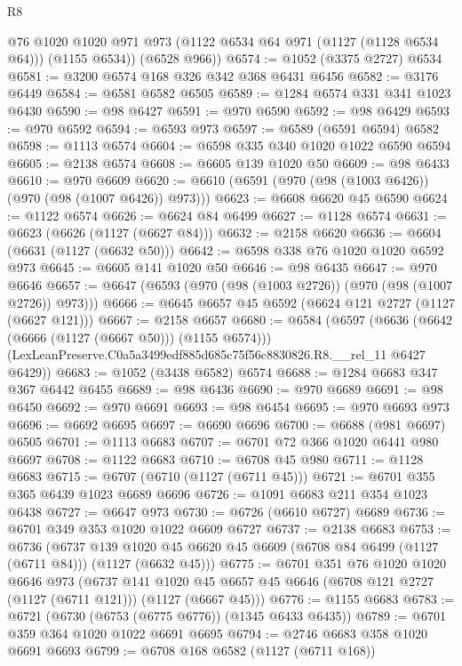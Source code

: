 \begin{lexlean}{R8}
\begin{coremodule}
        @76
        @1020
        @1020
        @971
        @973
        (@1122 @6534 @64 @971 (@1127 (@1128 @6534 @64)))
        (@1155 @6534))
      (@6528 @966))
@6574 := @1052 (@3375 @2727) @6534
@6581 := @3200 @6574 @168 @326 @342 @368 @6431 @6456
@6582 := @3176 @6449
@6584 := @6581 @6582 @6505
@6589 := @1284 @6574 @331 @341 @1023 @6430
@6590 := @98 @6427
@6591 := @970 @6590
@6592 := @98 @6429
@6593 := @970 @6592
@6594 := @6593 @973
@6597 := @6589 (@6591 @6594) @6582
@6598 := @1113 @6574
@6604 := @6598 @335 @340 @1020 @1022 @6590 @6594
@6605 := @2138 @6574
@6608 := @6605 @139 @1020 @50
@6609 := @98 @6433
@6610 := @970 @6609
@6620 := @6610 (@6591 (@970 (@98 (@1003 @6426)) (@970 (@98 (@1007 @6426)) @973)))
@6623 := @6608 @6620 @45 @6590
@6624 := @1122 @6574
@6626 := @6624 @84 @6499
@6627 := @1128 @6574
@6631 := @6623 (@6626 (@1127 (@6627 @84)))
@6632 := @2158 @6620
@6636 := @6604 (@6631 (@1127 (@6632 @50)))
@6642 := @6598 @338 @76 @1020 @1020 @6592 @973
@6645 := @6605 @141 @1020 @50
@6646 := @98 @6435
@6647 := @970 @6646
@6657 := @6647 (@6593 (@970 (@98 (@1003 @2726)) (@970 (@98 (@1007 @2726)) @973)))
@6666 := @6645 @6657 @45 @6592 (@6624 @121 @2727 (@1127 (@6627 @121)))
@6667 := @2158 @6657
@6680 := @6584
    (@6597
      (@6636 (@6642 (@6666 (@1127 (@6667 @50))) (@1155 @6574)))
      (LexLeanPreserve.C0a5a3499edf885d685c75f56c8830826.R8.__rel_11 @6427 @6429))
@6683 := @1052 (@3438 @6582) @6574
@6688 := @1284 @6683 @347 @367 @6442 @6455
@6689 := @98 @6436
@6690 := @970 @6689
@6691 := @98 @6450
@6692 := @970 @6691
@6693 := @98 @6454
@6695 := @970 @6693 @973
@6696 := @6692 @6695
@6697 := @6690 @6696
@6700 := @6688 (@981 @6697) @6505
@6701 := @1113 @6683
@6707 := @6701 @72 @366 @1020 @6441 @980 @6697
@6708 := @1122 @6683
@6710 := @6708 @45 @980
@6711 := @1128 @6683
@6715 := @6707 (@6710 (@1127 (@6711 @45)))
@6721 := @6701 @355 @365 @6439 @1023 @6689 @6696
@6726 := @1091 @6683 @211 @354 @1023 @6438
@6727 := @6647 @973
@6730 := @6726 (@6610 @6727) @6689
@6736 := @6701 @349 @353 @1020 @1022 @6609 @6727
@6737 := @2138 @6683
@6753 := @6736
    (@6737 @139 @1020 @45 @6620 @45 @6609 (@6708 @84 @6499 (@1127 (@6711 @84))) (@1127 (@6632 @45)))
@6775 := @6701
    @351
    @76
    @1020
    @1020
    @6646
    @973
    (@6737
      @141
      @1020
      @45
      @6657
      @45
      @6646
      (@6708 @121 @2727 (@1127 (@6711 @121)))
      (@1127 (@6667 @45)))
@6776 := @1155 @6683
@6783 := @6721 (@6730 (@6753 (@6775 @6776)) (@1345 @6433 @6435))
@6789 := @6701 @359 @364 @1020 @1022 @6691 @6695
@6794 := @2746 @6683 @358 @1020 @6691 @6693
@6799 := @6708 @168 @6582 (@1127 (@6711 @168))

\end{coremodule}
\end{lexlean}
